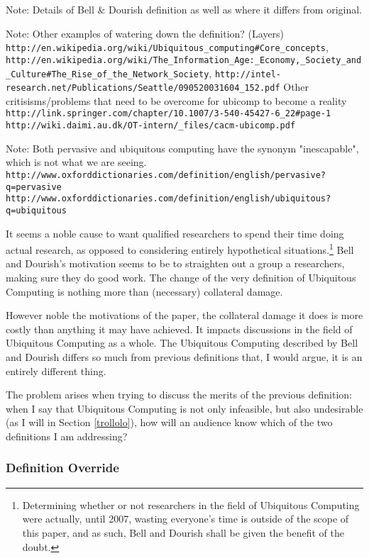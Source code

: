 Note: Details of Bell \& Dourish definition as well as where it differs from original.\cite{bell07}

Note:
Other examples of watering down the definition? (Layers)
\verb+http://en.wikipedia.org/wiki/Ubiquitous_computing#Core_concepts+,
\verb+http://en.wikipedia.org/wiki/The_Information_Age:_Economy,_Society_and_Culture#The_Rise_of_the_Network_Society+,
\verb+http://intel-research.net/Publications/Seattle/090520031604_152.pdf+
Other critisisms/problems that need to be overcome for ubicomp to become a reality
\verb+http://link.springer.com/chapter/10.1007/3-540-45427-6_22#page-1+
\verb+http://wiki.daimi.au.dk/OT-intern/_files/cacm-ubicomp.pdf+

Note: Both pervasive and ubiquitous computing have the synonym "inescapable", which is not what we are seeing.
\verb+http://www.oxforddictionaries.com/definition/english/pervasive?q=pervasive+
\verb+http://www.oxforddictionaries.com/definition/english/ubiquitous?q=ubiquitous+

It seems a noble cause to want qualified researchers to spend their time doing actual research, as opposed to
considering entirely hypothetical situations.\footnote{Determining whether or not researchers in the field of
Ubiquitous Computing were actually, until 2007, wasting everyone's time is outside of the scope of this paper,
and as such, Bell and Dourish shall be given the benefit of the doubt.} Bell and Dourish's motivation seems to
be to straighten out a group a researchers, making sure they do good work. The change of the very definition of
Ubiquitous Computing is nothing more than (necessary) collateral damage.

However noble the motivations of the paper, the collateral damage it does is more costly than anything it may have
achieved. It impacts discussions in the field of Ubiquitous Computing as a whole. The Ubiquitous Computing described
by Bell and Dourish differs so much from previous definitions that, I would argue, it is an entirely different
thing.

The problem arises when trying to discuss the merits of the previous definition: when I say that Ubiquitous
Computing is not only infeasible, but also undesirable (as I will in Section \ref{trollolo}), how will an audience
know which of the two definitions I am addressing?

\subsubsection{Definition Override}

